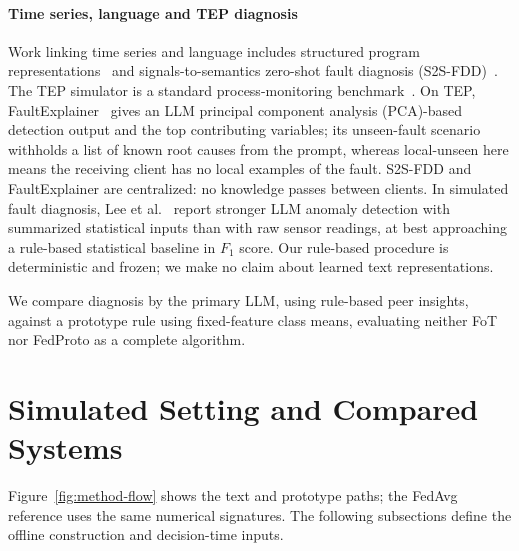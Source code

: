 \documentclass[conference]{IEEEtran}
\newcommand{\TEP}{TEP}
\newcommand{\lu}{local-unseen}
\begin{document}
\paragraph{Time series, language and \TEP{} diagnosis}
Work linking time series and language includes structured program representations~\cite{kim2026t2sp} and signals-to-semantics zero-shot fault diagnosis (S2S-FDD)~\cite{li2025s2sfdd}. The \TEP{} simulator is a standard process-monitoring benchmark~\cite{downs1993tep,bathelt2015tep}. On \TEP{}, FaultExplainer~\cite{khan2025faultexplainer} gives an LLM principal component analysis (PCA)-based detection output and the top contributing variables; its unseen-fault scenario withholds a list of known root causes from the prompt, whereas \lu{} here means the receiving client has no local examples of the fault. S2S-FDD and FaultExplainer are centralized: no knowledge passes between clients. In simulated fault diagnosis, Lee et al.~\cite{lee2025agentic} report stronger LLM anomaly detection with summarized statistical inputs than with raw sensor readings, at best approaching a rule-based statistical baseline in $F_1$ score. Our rule-based procedure is deterministic and frozen; we make no claim about learned text representations.

We compare diagnosis by the primary LLM, using rule-based peer insights, against a prototype rule using fixed-feature class means, evaluating neither FoT nor FedProto as a complete algorithm.

\section{Simulated Setting and Compared Systems}
\label{sec:method}

Figure~\ref{fig:method-flow} shows the text and prototype paths; the FedAvg reference uses the same numerical signatures. The following subsections define the offline construction and decision-time inputs.

\end{document}
